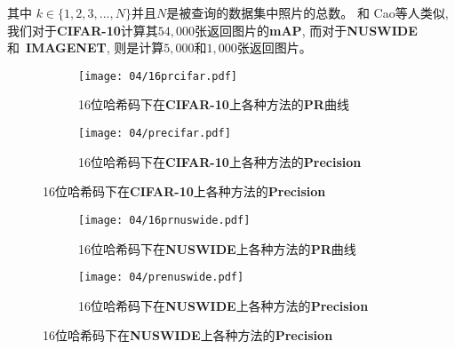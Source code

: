 其中 $k \in \{1, 2, 3, ..., N\}$并且$N$是被查询的数据集中照片的总数。
和 Cao等人类似\cite{cao2018deep,cao2017hashnet}, 我们对于\textbf{CIFAR-10}计算其$54,000$张返回图片的\textbf{mAP}, 而对于\textbf{NUSWIDE}和~\textbf{IMAGENET}, 则是计算$5,000$和$1,000$张返回图片。



\begin{figure}[!htp]
    \centering
    \begin{subfigure}{\textwidth}
      \centering
      \texttt{[image: 04/16prcifar.pdf]}
      \caption{16位哈希码下在\textbf{CIFAR-10}上各种方法的\textbf{PR}曲线}
    \end{subfigure}
    \hspace{1cm}
    \begin{subfigure}{\textwidth}
      \centering
      \texttt{[image: 04/precifar.pdf]}
      \caption{16位哈希码下在\textbf{CIFAR-10}上各种方法的\textbf{Precision}}
    \end{subfigure}
    \label{fig:rescifar}
  \end{figure}

  \begin{figure}[!htp]
    \centering
    \begin{subfigure}{\textwidth}
      \centering
      \texttt{[image: 04/16prnuswide.pdf]}
      \caption{16位哈希码下在\textbf{NUSWIDE}上各种方法的\textbf{PR}曲线}
    \end{subfigure}
    \hspace{1cm}
    \begin{subfigure}{\textwidth}
      \centering
      \texttt{[image: 04/prenuswide.pdf]}
      \caption{16位哈希码下在\textbf{NUSWIDE}上各种方法的\textbf{Precision}}
    \end{subfigure}
    \label{fig:nuswide}
  \end{figure}

